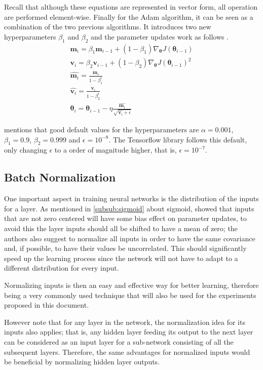 Recall that although these equations are represented in vector form, all operation are performed element-wise. Finally for the \gls{Adam} algorithm, it can be seen as a combination of the two previous algorithms. It introduces two new hyperparameters $\beta_1$ and $\beta_2$ and the parameter updates work as follows \cite{adam2017}.
\begin{gather}
    \bm{m}_i = \beta_1 \bm{m}_{i-1} + (1 - \beta_1) \nabla_{\bm{\theta}} J(\bm{\theta}_{i-1}) \\[5pt]
    \bm{v}_i = \beta_2 \bm{v}_{i-1} + (1 - \beta_2) \nabla_{\bm{\theta}} J(\bm{\theta}_{i-1})^2 \\[5pt]
    \hat{\bm{m}_i} = \frac{\bm{m}_i}{1 - \beta_1^i} \\[5pt]
    \hat{\bm{v}_i} = \frac{\bm{v}_i}{1 - \beta_2^i} \\[5pt]
    \bm{\theta}_i = \bm{\theta}_{i-1} - \eta \frac{\hat{\bm{m}_i}}{\sqrt{\hat{\bm{v}_i} + \epsilon}}
\end{gather}

\textcite{adam2017} mentions that good default values for the hyperparameters are $\alpha = 0.001$, $\beta_1 = 0.9$, $\beta_2 = 0.999$ and $\epsilon = 10^{-8}$. The Tensorflow library \cite{tensorflow2015} follows this default, only changing $\epsilon$ to a order of magnitude higher, that is, $\epsilon = 10^{-7}$.

\subsection{Batch Normalization}
One important aspect in training neural networks is the distribution of the inputs for a layer. As mentioned in \autoref{subsub:sigmoid} about sigmoid, \textcite{efficientBackprop2012} showed that inputs that are not zero centered will have some bias effect on parameter updates, to avoid this the layer inputs should all be shifted to have a mean of zero; the authors also suggest to normalize all inputs in order to have the same covariance and, if possible, to have their values be uncorrelated. This should significantly speed up the learning process since the network will not have to adapt to a different distribution for every input.

Normalizing inputs is then an easy and effective way for better learning, therefore being a very commonly used technique that will also be used for the experiments proposed in this document.

However \textcite{batchnorm2015} note that for any layer in the network, the normalization idea for its inputs also applies; that is, any hidden layer feeding its output to the next layer can be considered as an input layer for a sub-network consisting of all the subsequent layers. Therefore, the same advantages for normalized inputs would be beneficial by normalizing hidden layer outputs.

